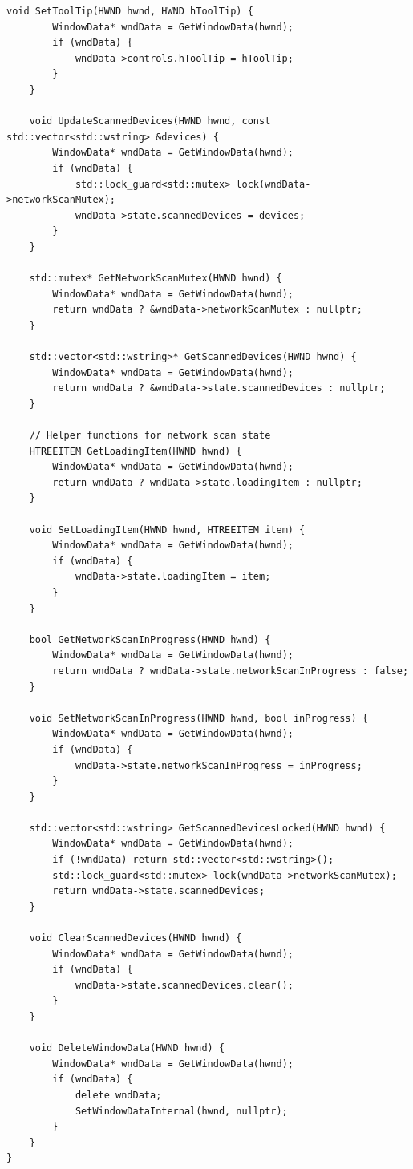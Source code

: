\begin{lstlisting}[style=CodeListing]
    void SetToolTip(HWND hwnd, HWND hToolTip) {
        WindowData* wndData = GetWindowData(hwnd);
        if (wndData) {
            wndData->controls.hToolTip = hToolTip;
        }
    }
    
    void UpdateScannedDevices(HWND hwnd, const std::vector<std::wstring> &devices) {
        WindowData* wndData = GetWindowData(hwnd);
        if (wndData) {
            std::lock_guard<std::mutex> lock(wndData->networkScanMutex);
            wndData->state.scannedDevices = devices;
        }
    }
    
    std::mutex* GetNetworkScanMutex(HWND hwnd) {
        WindowData* wndData = GetWindowData(hwnd);
        return wndData ? &wndData->networkScanMutex : nullptr;
    }
    
    std::vector<std::wstring>* GetScannedDevices(HWND hwnd) {
        WindowData* wndData = GetWindowData(hwnd);
        return wndData ? &wndData->state.scannedDevices : nullptr;
    }
    
    // Helper functions for network scan state
    HTREEITEM GetLoadingItem(HWND hwnd) {
        WindowData* wndData = GetWindowData(hwnd);
        return wndData ? wndData->state.loadingItem : nullptr;
    }
    
    void SetLoadingItem(HWND hwnd, HTREEITEM item) {
        WindowData* wndData = GetWindowData(hwnd);
        if (wndData) {
            wndData->state.loadingItem = item;
        }
    }
    
    bool GetNetworkScanInProgress(HWND hwnd) {
        WindowData* wndData = GetWindowData(hwnd);
        return wndData ? wndData->state.networkScanInProgress : false;
    }
    
    void SetNetworkScanInProgress(HWND hwnd, bool inProgress) {
        WindowData* wndData = GetWindowData(hwnd);
        if (wndData) {
            wndData->state.networkScanInProgress = inProgress;
        }
    }
    
    std::vector<std::wstring> GetScannedDevicesLocked(HWND hwnd) {
        WindowData* wndData = GetWindowData(hwnd);
        if (!wndData) return std::vector<std::wstring>();
        std::lock_guard<std::mutex> lock(wndData->networkScanMutex);
        return wndData->state.scannedDevices;
    }
    
    void ClearScannedDevices(HWND hwnd) {
        WindowData* wndData = GetWindowData(hwnd);
        if (wndData) {
            wndData->state.scannedDevices.clear();
        }
    }
    
    void DeleteWindowData(HWND hwnd) {
        WindowData* wndData = GetWindowData(hwnd);
        if (wndData) {
            delete wndData;
            SetWindowDataInternal(hwnd, nullptr);
        }
    }
}
\end{lstlisting}


